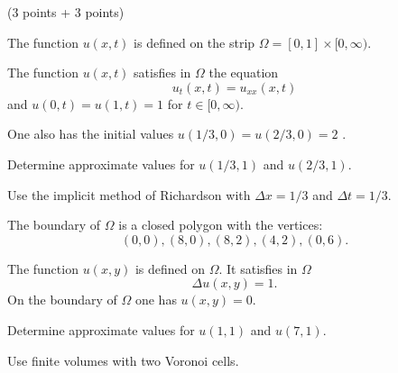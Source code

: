 (3 points + 3 points)
\begin{teilaufgaben}
\item
The function $u(x,t)$ is defined on the strip
$\Omega = [0,1] \times [0,\infty)$.

The function $u(x,t)$ satisfies in $\Omega$ the equation
\[
u_{t}(x,t) = u_{xx}(x,t)
\]
and  $u(0,t) = u(1,t) = 1$ for $t \in [0,\infty)$.

One also has the initial values $u(1/3,0) = u(2/3,0) = 2$ .

Determine approximate values for $u(1/3,1)$ and $u(2/3,1)$.

Use the implicit method of Richardson with $\Delta x = 1/3$ and
$\Delta t = 1/3$.

\item
The boundary of $\Omega$ is a closed polygon with the vertices:
\[
(0,0), (8,0), (8,2), (4,2), (0,6). 
\]

The function $u(x,y)$ is defined on $\Omega$. It satisfies in $\Omega$ 
\[
\Delta u(x,y) = 1.
\]
On the boundary of $\Omega$ one has $u(x,y) = 0$. 

Determine approximate values for $u(1,1)$ and $u(7,1)$. 

Use finite volumes with two Voronoi cells.  
\end{teilaufgaben}

